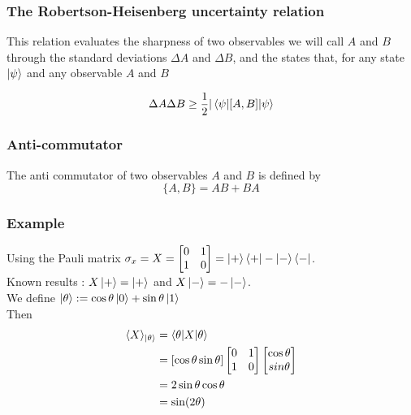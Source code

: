 \documentclass{article}
\begin{document}
\subsubsection*{The Robertson-Heisenberg uncertainty relation}
This relation evaluates the sharpness of two observables we will call $A$ and
$B$ through the standard deviations $\Delta A$ and $\Delta B$, and the states
that, for any state $\ket{\psi}$ and any observable $A$ and $B$

\begin{equation}
    \Delta A \Delta B \geq \frac{1}{2}|\braket{\psi|[A,B]|\psi}
\end{equation}

\subsubsection*{Anti-commutator}
The anti commutator of two observables $A$ and $B$ is defined by
\begin{equation}
    \{A,B\} = AB+BA
\end{equation}

\subsubsection*{Example}
Using the Pauli matrix $\sigma_x = X =
    \begin{bmatrix}
    0 & 1 \\
    1 & 0
    \end{bmatrix}
    = \ket{+}\bra{+} - \ket{-}\bra{-} $. \\\noindent Known results : $X\ket{+} =
    \ket{+}$ and $X\ket{-}=-\ket{-}$. \\\noindent We define
    $\ket{\theta}:=\cos\theta\ket{0}+\sin\theta\ket{1}$ \\\noindent Then
\begin{equation}
    \begin{aligned}
        \langle X \rangle_{\ket{\theta}}
            & = \braket{\theta | X |\theta} \\
            & = [\cos \theta \sin \theta]
                \begin{bmatrix}0 & 1 \\ 1 & 0 \end{bmatrix}
                \begin{bmatrix} \cos \theta\\ sin \theta \end{bmatrix} \\
            & = 2 \sin\theta\cos\theta \\
            & = \sin (2\theta)
    \end{aligned}
\end{equation}
\end{document}
